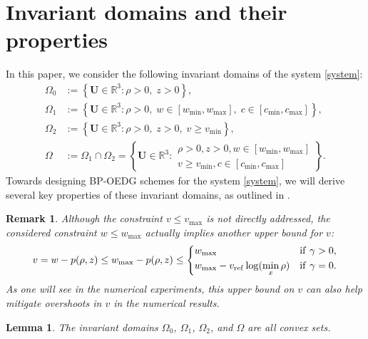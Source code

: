 \documentclass[times,final]{elsarticle}
\newtheorem{lemma}[theorem]{Lemma}
\newtheorem{remark}{Remark}[section]
\numberwithin{equation}{section}
\theoremstyle{definition}
\theoremstyle{remark}
\newcommand{\BU}{\mathbf{U}}
\begin{document}
\section{Invariant domains and their properties}\label{sec:inv}
In this paper, we consider the following invariant domains of the system \eqref{system}:
\begin{align}
	\Omega_0 &:= \left\{ \BU  \in \mathbb{R}^3 : \rho > 0, \; z > 0 \right\}, \nonumber \\
	\Omega_1 &:= \left\{ \BU  \in \mathbb{R}^3 : \rho > 0, \; w \in [w_{\min}, w_{\max}], \; c \in [c_{\min}, c_{\max}] \right\}, 
	\nonumber \\
	\Omega_2 &:= \left\{ \BU  \in \mathbb{R}^3 : \rho > 0, \; z > 0, \; v \geq v_{\min} \right\}, \label{eq:O2} \\
	\Omega   &:= \Omega_1 \cap \Omega_2
	= 
	\left\{
	\BU  \in \mathbb{R}^3
	:
	\begin{array}{r}
		\rho > 0, z > 0, w \in \left[ w_{\min}, w_{\max} \right] \\
		v \ge v_{\min},	c \in \left[ c_{\min}, c_{\max} \right]
	\end{array}
	\right\}.  \label{eq:270}
\end{align}
Towards designing BP-OEDG schemes for the system \eqref{system}, we will derive several key properties of these invariant domains, as outlined in .

\begin{remark}\label{rmk:435}
	Although the constraint $v \le v_{\max}$ is not directly addressed, the considered constraint $w \le w_{\max}$ actually implies another upper bound for $v$:
	\[
	v = w-p(\rho,z) \le w_{\max} - p(\rho,z)
	\le
	\begin{dcases}
		w_{\max} 
		& 
		{\rm if }~ \gamma > 0,
		\\
		w_{\max} - v_{\rm ref} \log (\min_x \rho)
		& {\rm if }~ \gamma = 0.
	\end{dcases}
	\]
	As one will see in the numerical experiments, this upper bound on $v$ can also help mitigate overshoots in $v$ in the numerical results. 
\end{remark}

\begin{lemma}\label{lem:466}
	The invariant domains $\Omega_0$, $\Omega_1$, $\Omega_2$, and $\Omega$ are all convex sets.
\end{lemma}
\end{document}
